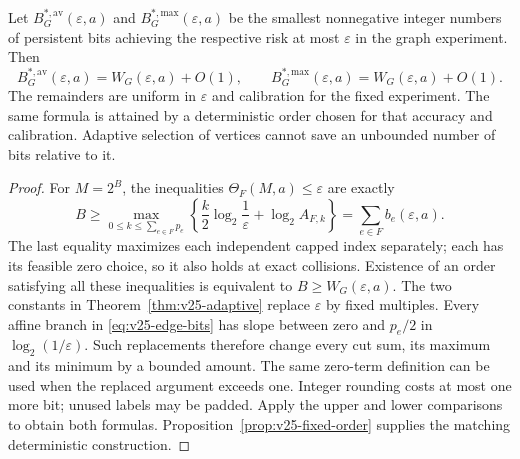 \begin{corollary}\label{cor:v25-graph-bits}
Let $B_G^{*,\mathrm{av}}(\varepsilon,a)$ and
$B_G^{*,\mathrm{max}}(\varepsilon,a)$ be the smallest nonnegative
integer numbers of persistent bits achieving the respective risk at
most $\varepsilon$ in the graph experiment. Then
\begin{equation}\label{eq:v25-graph-bit-law}
 B_G^{*,\mathrm{av}}(\varepsilon,a)
       =W_G(\varepsilon,a)+O(1),\qquad
 B_G^{*,\mathrm{max}}(\varepsilon,a)
       =W_G(\varepsilon,a)+O(1).
\end{equation}
The remainders are uniform in $\varepsilon$ and calibration for the
fixed experiment. The same formula is attained by a deterministic
order chosen for that accuracy and calibration. Adaptive selection of
vertices cannot save an unbounded number of bits relative to it.
\end{corollary}
\begin{proof}
For $M=2^B$, the inequalities $\Theta_F(M,a)\le\varepsilon$ are
exactly
\[
 B\ge\max_{0\le k\le\sum_{e\in F}p_e}
       \left\{\frac{k}{2}\log_2\frac1\varepsilon+\log_2 A_{F,k}\right\}
   =\sum_{e\in F}b_e(\varepsilon,a).
\]
The last equality maximizes each independent capped index separately;
each has its feasible zero choice, so it also holds at exact collisions.
Existence of an order satisfying all these inequalities is equivalent
to $B\ge W_G(\varepsilon,a)$. The two constants in
Theorem~\ref{thm:v25-adaptive} replace $\varepsilon$ by fixed multiples.
Every affine branch in \eqref{eq:v25-edge-bits} has slope between zero
and $p_e/2$ in $\log_2(1/\varepsilon)$. Such replacements therefore
change every cut sum, its maximum and its minimum by a bounded amount.
The same zero-term definition can be used when the replaced argument
exceeds one. Integer rounding costs at most one more bit; unused labels
may be padded. Apply the upper and lower comparisons to obtain both
formulas. Proposition~\ref{prop:v25-fixed-order} supplies the matching
deterministic construction.
\end{proof}

